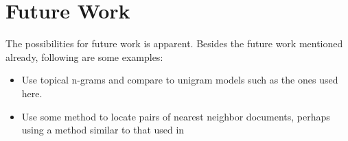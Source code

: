 \section {Future Work}
The possibilities for future work is apparent. Besides the future work mentioned already, following are some examples:
	\begin {itemize}
		\item Use topical n-grams and compare to unigram models such as the ones used here.
		\item Use some method to locate pairs of nearest neighbor documents, perhaps using a method similar to that used in \cite{Krstovski2013efficient}
	\end {itemize}

